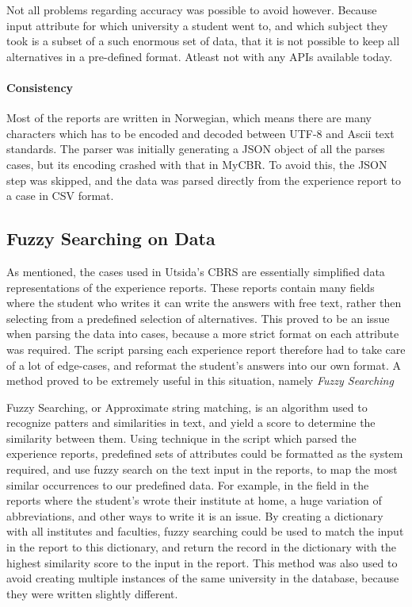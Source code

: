 Not all problems regarding accuracy was possible to avoid however. Because input attribute for which university a student went to, and which subject they took is a subset of a such enormous set of data, that it is not possible to keep all alternatives in a pre-defined format. Atleast not with any APIs available today.


\paragraph{Consistency}
Most of the reports are written in Norwegian, which means there are many characters which has to be encoded and decoded between UTF-8 and Ascii text standards. The parser was initially generating a JSON object of all the parses cases, but its encoding crashed with that in MyCBR. To avoid this, the JSON step was skipped, and the data was parsed directly from the experience report to a case in CSV format.

\subsection{Fuzzy Searching on Data}
As mentioned, the cases used in Utsida's CBRS are essentially simplified data representations of the experience reports. These reports contain many fields where the student who writes it can write the answers with free text, rather then selecting from a predefined selection of alternatives. This proved to be an issue when parsing the data into cases, because a more strict format on each attribute was required. The script parsing each experience report therefore had to take care of a lot of edge-cases, and reformat the student's answers into our own format. A method proved to be extremely useful in this situation, namely \emph{Fuzzy Searching}

Fuzzy Searching, or Approximate string matching, is an algorithm used to recognize patters and similarities in text, and yield a score to determine the similarity between them. Using technique in the script which parsed the experience reports, predefined sets of attributes could be formatted as the system required, and use fuzzy search on the text input in the reports, to map the most similar occurrences to our predefined data. For example, in the field in the reports where the student's wrote their institute at home, a huge variation of abbreviations, and other ways to write it is an issue. By creating a dictionary with all institutes and faculties, fuzzy searching could be used to match the input in the report to this dictionary, and return the record in the dictionary with the highest similarity score to the input in the report. This method was also used to avoid creating multiple instances of the same university in the database, because they were written slightly different.

